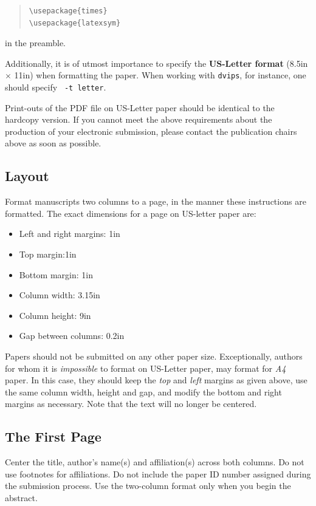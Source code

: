 \documentclass[11pt,letterpaper]{article}
\begin{document}
\begin{quote}
\begin{verbatim}
\usepackage{times}
\usepackage{latexsym}
\end{verbatim}
\end{quote}
in the preamble.

Additionally, it is of utmost importance to specify the {\bf
  US-Letter format} (8.5in $\times$ 11in) when formatting the paper.
When working with {\tt dvips}, for instance, one should specify {\tt
  -t letter}.

Print-outs of the PDF file on US-Letter paper should be identical to the
hardcopy version.  If you cannot meet the above requirements about the
production of your electronic submission, please contact the
publication chairs above  as soon as possible.


\subsection{Layout}
\label{ssec:layout}

Format manuscripts two columns to a page, in the manner these
instructions are formatted. The exact dimensions for a page on US-letter
paper are:

\begin{itemize}
\item Left and right margins: 1in
\item Top margin:1in
\item Bottom margin: 1in
\item Column width: 3.15in
\item Column height: 9in
\item Gap between columns: 0.2in
\end{itemize}

\noindent Papers should not be submitted on any other paper size. Exceptionally,
authors for whom it is \emph{impossible} to format on US-Letter paper,
may format for \emph{A4} paper. In this case, they should keep the \emph{top}
and \emph{left} margins as given above, use the same column width,
height and gap, and modify the bottom and right margins as necessary.
Note that the text will no longer be centered.

\subsection{The First Page}
\label{ssec:first}

Center the title, author's name(s) and affiliation(s) across both
columns. Do not use footnotes for affiliations.  Do not include the
paper ID number assigned during the submission process. 
Use the two-column format only when you begin the abstract.
\end{document}
